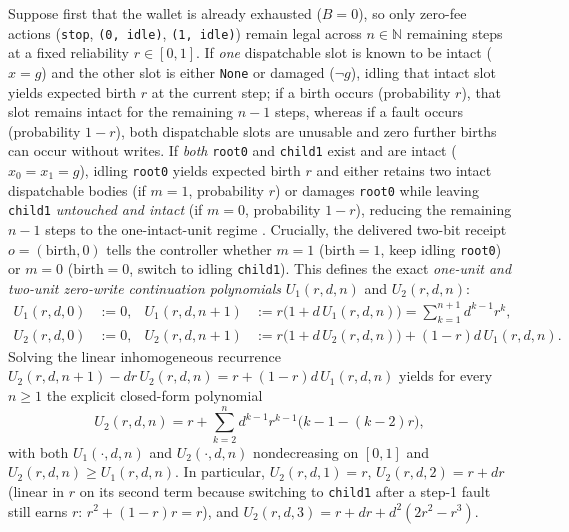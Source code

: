\documentclass[11pt,letterpaper]{article}
\begin{document}
Suppose first that the wallet is already exhausted (\(B = 0\)), so only
zero-fee actions (\texttt{stop}, \texttt{(0,\ idle)},
\texttt{(1,\ idle)}) remain legal across \(n \in \mathbb{N}\) remaining
steps at a fixed reliability \(r \in [0,1]\). If \emph{one} dispatchable
slot is known to be intact (\(x = g\)) and the other slot is either
\texttt{None} or damaged (\(\neg g\)), idling that intact slot yields
expected birth \(r\) at the current step; if a birth occurs (probability
\(r\)), that slot remains intact for the remaining \(n-1\) steps,
whereas if a fault occurs (probability \(1-r\)), both dispatchable slots
are unusable and zero further births can occur without writes. If
\emph{both} \texttt{root0} and \texttt{child1} exist and are intact
(\(x_0 = x_1 = g\)), idling \texttt{root0} yields expected birth \(r\)
and either retains two intact dispatchable bodies (if \(m = 1\),
probability \(r\)) or damages \texttt{root0} while leaving
\texttt{child1} \emph{untouched and intact} (if \(m = 0\), probability
\(1-r\)), reducing the remaining \(n-1\) steps to the one-intact-unit
regime \citep{barlowProschan1975, ross1970}. Crucially, the delivered
two-bit receipt \(o = (\mathrm{birth}, 0)\) tells the controller whether
\(m = 1\) (\(\mathrm{birth} = 1\), keep idling \texttt{root0}) or
\(m = 0\) (\(\mathrm{birth} = 0\), switch to idling \texttt{child1}).
This defines the exact \emph{one-unit and two-unit zero-write
continuation polynomials} \(U_1(r, d, n)\) and \(U_2(r, d, n)\):
\[\begin{aligned}
U_1(r, d, 0) &:= 0, & U_1(r, d, n+1) &:= r\bigl(1 + d\, U_1(r, d, n)\bigr) = \sum_{k=1}^{n+1} d^{k-1} r^k, \\
U_2(r, d, 0) &:= 0, & U_2(r, d, n+1) &:= r\bigl(1 + d\, U_2(r, d, n)\bigr) + (1 - r) d\, U_1(r, d, n).
\end{aligned}\] Solving the linear inhomogeneous recurrence
\(U_2(r, d, n+1) - d r\, U_2(r, d, n) = r + (1 - r) d\, U_1(r, d, n)\)
yields for every \(n \ge 1\) the explicit closed-form polynomial
\[U_2(r, d, n) = r + \sum_{k=2}^{n} d^{k-1} r^{k-1}\bigl(k - 1 - (k - 2)r\bigr),\]
with both \(U_1(\cdot, d, n)\) and \(U_2(\cdot, d, n)\) nondecreasing on
\([0,1]\) and \(U_2(r, d, n) \ge U_1(r, d, n)\). In particular,
\(U_2(r, d, 1) = r\), \(U_2(r, d, 2) = r + d r\) (linear in \(r\) on its
second term because switching to \texttt{child1} after a step-1 fault
still earns \(r\): \(r^2 + (1-r)r = r\)), and
\(U_2(r, d, 3) = r + d r + d^2(2r^2 - r^3)\).
\end{document}
